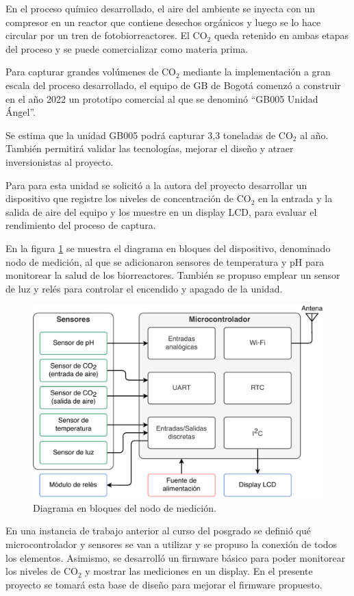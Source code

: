 \documentclass[
11pt, %
]{charter}
\begin{document}
En el proceso químico desarrollado, el aire del ambiente se inyecta con un compresor en un reactor que contiene desechos orgánicos y luego se lo hace circular por un tren de fotobiorreactores. El CO$_2$ queda retenido en ambas etapas del proceso y se puede comercializar como materia prima.

Para capturar grandes volúmenes de CO$_2$ mediante la implementación a gran escala del proceso desarrollado, el equipo de GB de Bogotá comenzó a construir en el año 2022 un prototipo comercial al que se denominó “GB005 Unidad Ángel”. 

Se estima que la unidad GB005 podrá capturar 3,3 toneladas de CO$_2$ al año. También permitirá validar las tecnologías, mejorar el diseño y atraer inversionistas al proyecto.

Para para esta unidad se solicitó a la autora del proyecto desarrollar un dispositivo que registre los niveles de concentración de CO$_2$ en la entrada y la salida de aire del equipo y los muestre en un display LCD, para evaluar el rendimiento del proceso de captura. 

En la figura \ref{fig:diagNodo} se muestra el diagrama en bloques del dispositivo, denominado nodo de medición, al que se adicionaron sensores de temperatura y pH para monitorear la salud de los biorreactores. También se propuso emplear un sensor de luz y relés para controlar el encendido y apagado de la unidad. 

\begin{figure}[htpb]
\centering 
\includegraphics[width=.65\textwidth]{./Figuras/dgNodo.pdf}
\caption{Diagrama en bloques del nodo de medición.}
\label{fig:diagNodo}
\end{figure}

En una instancia de trabajo anterior al curso del posgrado se definió qué microcontrolador y sensores se van a utilizar y se propuso la conexión de todos los elementos. Asimismo, se desarrolló un firmware básico para poder monitorear los niveles de CO$_2$ y mostrar las mediciones en un display. En el presente proyecto se tomará esta base de diseño para mejorar el firmware propuesto.
\end{document}
